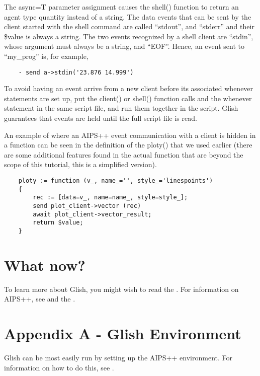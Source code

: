 The async=T parameter assignment causes the shell() function to return an
agent type quantity instead of a string.  The data events that can be sent
by the client started with the shell command are called ``stdout'', 
and ``stderr'' and their \$value is always a string.  The two 
events recognized by a shell client are
``stdin'', whose argument must always be a string, and ``EOF''.  Hence, an
event sent to ``my\_prog'' is, for example,

\begin{verbatim}
	- send a->stdin('23.876 14.999')
\end{verbatim}

    To avoid having an event arrive from a new client before its associated
whenever statements are set up, put the client() or shell() function calls
and the whenever statement in the same script file, and run them together in
the script.  Glish guarantees that events are held until the full script
file is read.

    An example of where an AIPS++ event communication with a client is
hidden in a function can be seen in the definition of the ploty() that we
used earlier (there are some additional features found in the
actual function that are beyond the scope of this tutorial, this is
a simplified version).

\begin{verbatim}
	ploty := function (v_, name_='', style_='linespoints')
	{
	    rec := [data=v_, name=name_, style=style_];
	    send plot_client->vector (rec)
	    await plot_client->vector_result;
	    return $value;
	}
\end{verbatim}

\section{What now?}

To learn more about Glish, you might wish to read the
. For information on AIPS++,
see  and the
.

\section{Appendix A - Glish Environment}

Glish can be most easily run by setting up the AIPS++ environment.
For information on how to do this, see .

